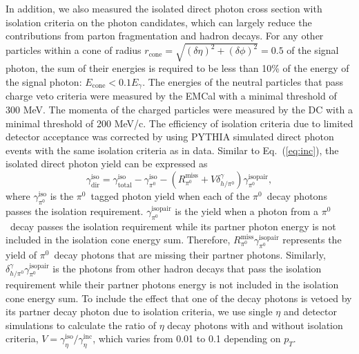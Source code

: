 \documentclass[twocolumn,letterpaper,aps,prl,longbibliography,superscriptaddress,floatfix]{revtex4-2}
\newcommand{\pT}{\ensuremath{p_T}}
\newcommand{\pizero}{\ensuremath{\pi^0}}
\begin{document}
In addition, we also measured the isolated direct photon cross section with isolation criteria on the photon candidates, which can largely reduce the contributions from parton fragmentation and hadron decays. For any other particles within a cone of radius $r_{\text{cone}} = \sqrt{(\delta\eta)^2 + (\delta\phi)^2} = 0.5$ of the signal photon, the sum of their energies is required to be less than 10\% of the energy of the signal photon: $E_{\text{cone}} < 0.1 E_{\gamma}$. The energies of the neutral particles that pass charge veto criteria were measured by the EMCal with a minimal threshold of 300 MeV. The momenta of the charged particles were measured by the DC with a minimal threshold of 200 MeV/c. The efficiency of isolation criteria due to limited detector acceptance was corrected by using PYTHIA simulated direct photon events with the same isolation criteria as in data. Similar to Eq.~(\ref{eq:inc}), the isolated direct photon yield can be expressed as
\begin{equation} \label{eq:iso}
\gamma_{\text{dir}}^{\text{iso}} = \gamma_{\text{total}}^{\text{iso}} - \gamma_{\pi^0}^{\text{iso}} - \left( R_{\pi^0}^{\text{miss}} + V\delta_{h/\pi^0}^{\gamma} \right) \gamma_{\pi^0}^{\text{isopair}},
\end{equation}
where $\gamma_{\pi^0}^{\text{iso}}$ is the \pizero \ tagged photon yield when each of the \pizero\ decay photons passes the isolation requirement. $\gamma_{\pi^0}^{\text{isopair}}$ is the yield when a photon from a \pizero\ decay passes the isolation requirement while its partner photon energy is not included in the isolation cone energy sum. Therefore, $R_{\pi^0}^{\text{miss}}\gamma_{\pi^0}^{\text{isopair}}$ represents the yield of \pizero\ decay photons that are missing their partner photons. Similarly, $\delta_{h/\pi^0}^{\gamma}\gamma_{\pi^0}^{\text{isopair}}$ is the photons from other hadron decays that pass the isolation requirement while their partner photons energy is not included in the isolation cone energy sum. To include the effect that one of the decay photons is vetoed by its partner decay photon due to isolation criteria, we use single $\eta$ and detector simulations to calculate the ratio of $\eta$ decay photons with and without isolation criteria, $V = \gamma^{\text{iso}}_{\eta}/\gamma^{\text{inc}}_{\eta}$, which varies from 0.01 to 0.1 depending on \pT.
\end{document}
